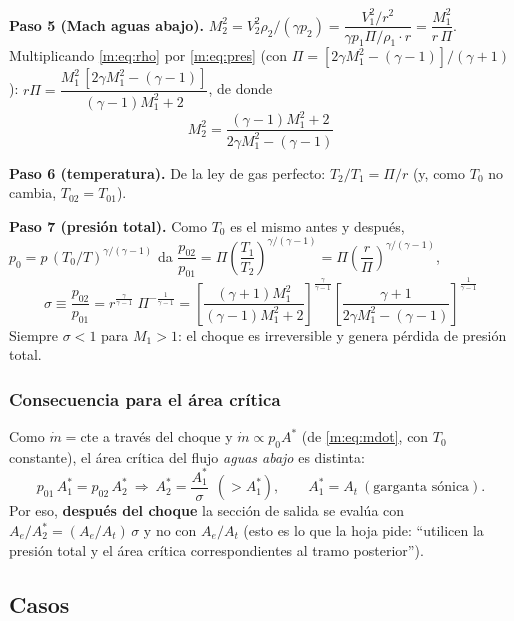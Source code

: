 \textbf{Paso 5 (Mach aguas abajo).} $M_2^2=V_2^2\rho_2/(\gamma p_2)=\dfrac{V_1^2/r^2}{\gamma p_1\Pi/\rho_1\cdot r}=\dfrac{M_1^2}{r\,\Pi}$. Multiplicando \eqref{m:eq:rho}
por \eqref{m:eq:pres} (con $\Pi=[2\gamma M_1^2-(\gamma-1)]/(\gamma+1)$):
$r\Pi=\dfrac{M_1^2\,[2\gamma M_1^2-(\gamma-1)]}{(\gamma-1)M_1^2+2}$, de donde
\begin{equation}
\boxed{M_2^2=\frac{(\gamma-1)M_1^2+2}{2\gamma M_1^2-(\gamma-1)}}\label{m:eq:M2}
\end{equation}

\textbf{Paso 6 (temperatura).} De la ley de gas perfecto: $T_2/T_1=\Pi/r$ (y, como $T_0$ no cambia, $T_{02}=T_{01}$).

\textbf{Paso 7 (presión total).} Como $T_0$ es el mismo antes y después, $p_0=p\,(T_0/T)^{\gamma/(\gamma-1)}$ da
$\dfrac{p_{02}}{p_{01}}=\Pi\left(\dfrac{T_1}{T_2}\right)^{\gamma/(\gamma-1)}=\Pi\left(\dfrac r\Pi\right)^{\gamma/(\gamma-1)}$, \ie
\begin{equation}
\boxed{\sigma\equiv\frac{p_{02}}{p_{01}}=r^{\frac{\gamma}{\gamma-1}}\;\Pi^{-\frac{1}{\gamma-1}}
=\left[\frac{(\gamma+1)M_1^2}{(\gamma-1)M_1^2+2}\right]^{\frac{\gamma}{\gamma-1}}\left[\frac{\gamma+1}{2\gamma M_1^2-(\gamma-1)}\right]^{\frac{1}{\gamma-1}}}\label{m:eq:sigma}
\end{equation}
Siempre $\sigma<1$ para $M_1>1$: el choque es irreversible y genera pérdida de presión total.

\subsubsection{Consecuencia para el área crítica}
Como $\dot m=\text{cte}$ a través del choque y $\dot m\propto p_0A^*$ (de \eqref{m:eq:mdot}, con $T_0$ constante), el área crítica
del flujo \emph{aguas abajo} es distinta:
\begin{equation}
p_{01}\,A^*_1=p_{02}\,A^*_2\ \Longrightarrow\ \boxed{A^*_2=\frac{A^*_1}{\sigma}}\ \ (>A^*_1),\qquad A^*_1=A_t\ (\text{garganta sónica}).
\label{m:eq:Astar2}
\end{equation}
Por eso, \textbf{después del choque} la sección de salida se evalúa con $A_e/A^*_2=(A_e/A_t)\,\sigma$ y no con $A_e/A_t$
(esto es lo que la hoja pide: ``utilicen la presión total y el área crítica correspondientes al tramo posterior'').

\subsection{Casos}
